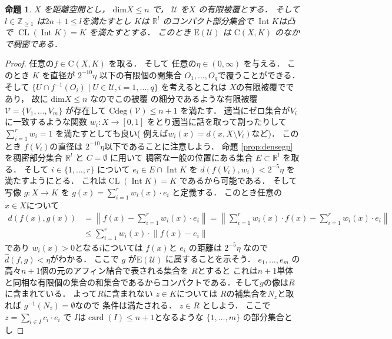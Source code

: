 \documentclass[leqno, a4paper, 12pt]{jsarticle}
\newtheorem{prop}[thm]{命題}
\newcommand{\zz}{\mathbb{Z}}
\newcommand{\rr}{\mathbb{R}}
\DeclareMathOperator{\card}{card}
\DeclareMathOperator{\cl}{CL}
\DeclareMathOperator{\nai}{Int}
\newcommand{\yodim}{\mathrm{dim}}
\newcommand{\yodeg}{\mathrm{Cdeg}}
\newcommand{\yocovf}[1]{\mathcal{#1}}
\newcommand{\yosupmet}[1]{\widehat{#1}}
\newcommand{\yofuncsp}[2]{\mathrm{C}(#1, #2)}
\newcommand{\yofsusm}[1]{\mathrm{E}(#1)}
\numberwithin{equation}{section}
\begin{document}
\begin{prop}\label{prop:smalldense}
$X$
を距離空間とし，
$\yodim X\le n$
で，
$\yocovf{U}$
を$X$
の有限被覆とする．
そして
$l\in \zz_{\ge 1}$
は$2n+1\le l$を満たすとし
$K$は
$\rr^{l}$
のコンパクト部分集合で
$\nai K$は凸で
$\cl (\nai K)=K$
を満たすとする．
このとき
$\yofsusm{\yocovf{U}}$
は
$\yofuncsp{X}{K}$
のなかで稠密である．
\end{prop}
\begin{proof}
任意の$f\in \yofuncsp{X}{K}$
を取る．
そして
任意の$\eta\in (0, \infty)$
を与える．
このとき
$K$
を直径が
$2^{-10}\eta$
以下の有限個の開集合
$O_{1}, \dots, O_{q}$で覆うことができる．
そして
$\{U\cap f^{-1}(O_{i})\mid U\in \yocovf{U}, i=1, \dots, q\}$
を考えるとこれは
$X$の有限被覆でであり，
故に
$\yodim X\le n$
なのでこの被覆
の細分であるような有限被覆
$\yocovf{V}=\{V_{1}, \dots, V_{m}\}$
が存在して
$\yodeg(\yocovf{V})\le n+1$
を満たす．
適当にゼロ集合が$V_{i}$
に一致するような関数
$w_{i}\colon X\to [0, 1]$
をとり適当に話を取って割ったりして
$\sum_{i=1}^{r}w_{i}=1$
を満たすとしても良い(
例えば$w_{i}(x)=d(x, X\setminus V_{i})$など)．
このとき
$f(V_{i})$の直径は
$2^{-10}\eta$以下であることに注意しよう．
命題
\ref{prop:densegp}
を稠密部分集合
$\rr^{l}$
と
$C=\emptyset$
に用いて
稠密な一般の位置にある集合
$E\subset \rr^{l}$
を取る．
そして
$i\in \{1, \dots, r\}$
について
$e_{i}\in E\cap \nai K$
を
$d(f(V_{i}), w_{i})<2^{-5}\eta$
を満たすようにとる．
これは$\cl(\nai K)=K$
であるから可能である．
そして写像
$g\colon X\to K$
を
$g(x)=\sum_{i=1}^{r}w_{i}(x)\cdot e_{i}$
と定義する．
このとき任意の$x\in X$について
\begin{align*}
d(f(x), g(x))&=\left\lVert f(x)-  \sum_{i=1}^{r}w_{i}(x)\cdot e_{i}\right\rVert
=
\left\lVert \sum_{i=1}^{r}w_{i}(x)\cdot f(x)-  \sum_{i=1}^{r}w_{i}(x)\cdot e_{i}\right\rVert\\
&\le 
 \sum_{i=1}^{r}w_{i}(x)\cdot \left\lVert f(x)-  e_{i}\right\rVert
\end{align*}
であり
$w_{i}(x)>0$となる$i$については
$f(x)$と
$e_{i}$
の距離は
$2^{-5}\eta$
なので
$\yosupmet{d}(f, g)<\eta$がわかる．
ここで
$g$
が$\yofsusm{\yocovf{U}}$
に属することを示そう．
$e_{1}, \dots, e_{m}$
の高々$n+1$個の元のアフィン結合で表される集合を
$R$とすると
これは$n+1$単体と同相な有限個の集合の和集合であるからコンパクトである．そして$g$の像は$R$に含まれている．
よって$R$に含まれない
$z\in K$については
$R$の補集合を$N_{z}$と取れば
$g^{-1}(N_{z})=\emptyset$なので
条件は満たされる．
$z\in R$
としよう．
ここで
$z=\sum_{i\in I}c_{i}\cdot e_{i}$
で
$I$は$\card(I)\le n+1$となるような
$\{1, \dots, m\}$
の部分集合とし

\end{proof}
\end{document}
